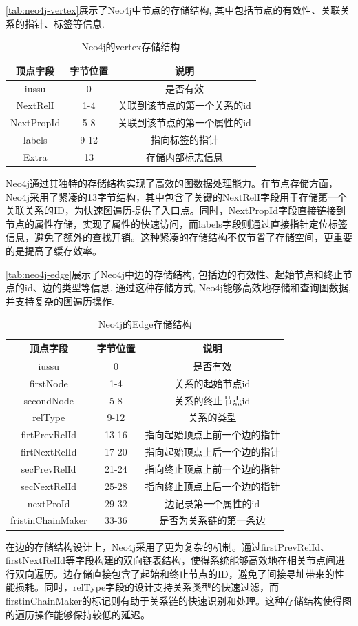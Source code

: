\autoref{tab:neo4j-vertex}展示了Neo4j中节点的存储结构, 其中包括节点的有效性、关联关系的指针、标签等信息.
\begin{table}[H]
	\centering
	\caption{Neo4j的vertex存储结构}
	\begin{tabular}{|c|c|c|}
		\hline
		顶点字段       & 字节位置 & 说明              \\
		\hline
		iussu      & 0    & 是否有效            \\
		NextRelI   & 1-4  & 关联到该节点的第一个关系的id \\
		NextPropId & 5-8  & 关联到该节点的第一个属性的id \\
		labels     & 9-12 & 指向标签的指针         \\
		Extra      & 13   & 存储内部标志信息        \\
		\hline
	\end{tabular}
	\label{tab:neo4j-vertex}
\end{table}
Neo4j通过其独特的存储结构实现了高效的图数据处理能力。在节点存储方面，Neo4j采用了紧凑的13字节结构，其中包含了关键的NextRelI字段用于存储第一个关联关系的ID，为快速图遍历提供了入口点。同时，NextPropId字段直接链接到节点的属性存储，实现了属性的快速访问，而labels字段则通过直接指针定位标签信息，避免了额外的查找开销。这种紧凑的存储结构不仅节省了存储空间，更重要的是提高了缓存效率。


\autoref{tab:neo4j-edge}展示了Neo4j中边的存储结构, 包括边的有效性、起始节点和终止节点的id、边的类型等信息. 通过这种存储方式, Neo4j能够高效地存储和查询图数据, 并支持复杂的图遍历操作.
\begin{table}[H]
	\centering
	\caption{Neo4j的Edge存储结构}
	\begin{tabular}{|c|c|c|}
		\hline
		顶点字段              & 字节位置  & 说明             \\
		\hline
		iussu             & 0     & 是否有效           \\
		firstNode         & 1-4   & 关系的起始节点id      \\
		secondNode        & 5-8   & 关系的终止节点id      \\
		relType           & 9-12  & 关系的类型          \\
		firtPrevRelId     & 13-16 & 指向起始顶点上前一个边的指针 \\
		firtNextRelId     & 17-20 & 指向起始顶点上后一个边的指针 \\
		secPrevRelId      & 21-24 & 指向终止顶点上前一个边的指针 \\
		secNextRelId      & 25-28 & 指向终止顶点上后一个边的指针 \\
		nextProId         & 29-32 & 边记录第一个属性的id    \\
		fristinChainMaker & 33-36 & 是否为关系链的第一条边    \\
		\hline
	\end{tabular}
	\label{tab:neo4j-edge}
\end{table}
在边的存储结构设计上，Neo4j采用了更为复杂的机制。通过firstPrevRelId、firstNextRelId等字段构建的双向链表结构，使得系统能够高效地在相关节点间进行双向遍历。边存储直接包含了起始和终止节点的ID，避免了间接寻址带来的性能损耗。同时，relType字段的设计支持关系类型的快速过滤，而firstinChainMaker的标记则有助于关系链的快速识别和处理。这种存储结构使得图的遍历操作能够保持较低的延迟。

